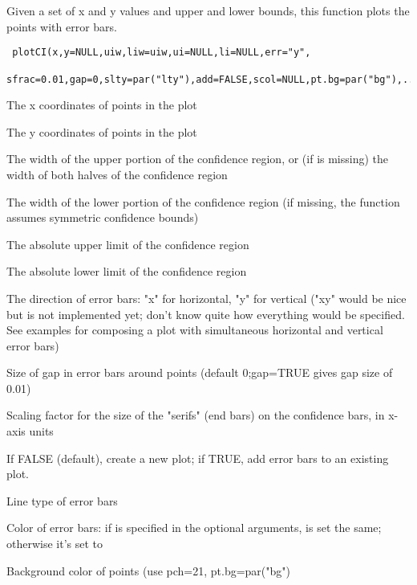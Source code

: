 \begin{Description}\relax
Given a set of x and y values and upper and lower bounds,
this function plots the points with error bars.
\end{Description}
\begin{Usage}
\begin{verbatim}
 plotCI(x,y=NULL,uiw,liw=uiw,ui=NULL,li=NULL,err="y",
  sfrac=0.01,gap=0,slty=par("lty"),add=FALSE,scol=NULL,pt.bg=par("bg"),...)
\end{verbatim}
\end{Usage}
\begin{Arguments}
\begin{ldescription}
\item[\code{x}] The x coordinates of points in the plot
\item[\code{y}] The y coordinates of points in the plot
\item[\code{uiw}] The width of the upper portion of the confidence region,
or (if  is missing) the width of both halves of
the confidence region
\item[\code{liw}] The width of the lower portion of the confidence region (if
missing, the function assumes symmetric confidence bounds)
\item[\code{ui}] The absolute upper limit of the confidence region
\item[\code{li}] The absolute lower limit of the confidence region
\item[\code{err}] The direction of error bars: "x" for horizontal, "y"
for vertical ("xy" would be nice but is not implemented yet; don't
know quite how everything would be specified.  See examples for
composing a plot with simultaneous horizontal and vertical error bars)
\item[\code{gap}] Size of gap in error bars around points
(default 0;gap=TRUE gives gap size of 0.01)
\item[\code{sfrac}] Scaling factor for the size of the "serifs" (end bars) on
the confidence bars, in x-axis units
\item[\code{add}] If FALSE (default), create a new plot; if TRUE, add error
bars to an existing plot.
\item[\code{slty}] Line type of error bars
\item[\code{scol}] Color of error bars: if  is specified in the
optional arguments,  is set the same; otherwise it's set
to 
\item[\code{pt.bg}] Background color of points (use pch=21, pt.bg=par("bg")

\end{ldescription}
\end{Arguments}
